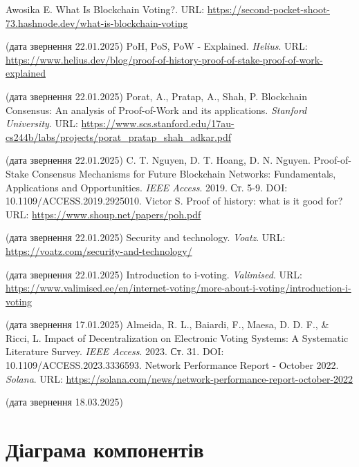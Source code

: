 \documentclass[14pt]{extreport}
\begin{document}
  \renewcommand\bibname{\MakeUppercase{Список літератури}}
  \begin{thebibliography}{99}
     Awosika E. What Is Blockchain Voting?. URL: \url{https://second-pocket-shoot-73.hashnode.dev/what-is-blockchain-voting}

    (дата звернення 22.01.2025)
     PoH, PoS, PoW - Explained. \textit{Helius}. URL: \url{https://www.helius.dev/blog/proof-of-history-proof-of-stake-proof-of-work-explained}
    
    (дата звернення 22.01.2025)
     Porat, A., Pratap, A., Shah, P. Blockchain Consensus: An analysis of Proof-of-Work and its applications. \textit{Stanford University}. URL: \url{https://www.scs.stanford.edu/17au-cs244b/labs/projects/porat_pratap_shah_adkar.pdf}
    
    (дата звернення 22.01.2025)
     C. T. Nguyen, D. T. Hoang, D. N. Nguyen. Proof-of-Stake Consensus Mechanisms for Future Blockchain Networks: Fundamentals, Applications and Opportunities. \textit{IEEE Access}. 2019. Ст. 5-9. DOI: 10.1109/ACCESS.2019.2925010.
     Victor S. Proof of history: what is it good for? URL: \url{https://www.shoup.net/papers/poh.pdf}
    
    (дата звернення 22.01.2025)
     Security and technology. \textit{Voatz}. URL: \url{https://voatz.com/security-and-technology/}
    
    (дата звернення 22.01.2025)
     Introduction to i-voting. \textit{Valimised}. 
    URL: \url{https://www.valimised.ee/en/internet-voting/more-about-i-voting/introduction-i-voting}
    
    (дата звернення 17.01.2025)
     Almeida, R. L., Baiardi, F., Maesa, D. D. F., \& Ricci, L. Impact of Decentralization on Electronic Voting Systems: A Systematic Literature Survey. \textit{IEEE Access}. 2023. Ст. 31. DOI: 10.1109/ACCESS.2023.3336593.
     Network Performance Report - October 2022. \textit{Solana}. URL: \url{https://solana.com/news/network-performance-report-october-2022}
    
    (дата звернення 18.03.2025)
  \end{thebibliography}
  
  \appendix
  \renewcommand{\thechapter}{\Alph{chapter}}
  \renewcommand{\chaptername}{Додаток}
  
  \chapter{Діаграма компонентів}
  \label{app:UMLComponent}
  
\end{document}
